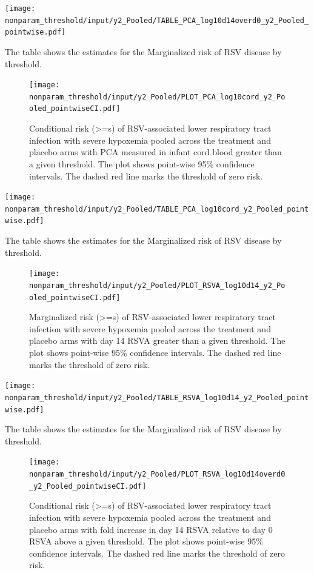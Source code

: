 \documentclass[11pt]{article}
\begin{document}
\begin{table}[H]
\centering
\texttt{[image: nonparam\_threshold/input/y2\_Pooled/TABLE\_PCA\_log10d14overd0\_y2\_Pooled\_pointwise.pdf]}
\caption{The table shows the  estimates for the Marginalized risk of RSV disease by threshold. }
\end{table}

\begin{figure}[H]
\centering
\texttt{[image: nonparam\_threshold/input/y2\_Pooled/PLOT\_PCA\_log10cord\_y2\_Pooled\_pointwiseCI.pdf]}
\caption{Conditional risk (>=s) of RSV-associated lower respiratory tract infection with severe hypoxemia pooled across the treatment and placebo arms with PCA measured in infant cord blood greater than a given threshold. The plot shows point-wise 95\% confidence intervals. The dashed red line marks the threshold of zero risk.}
\end{figure}

\begin{table}[H]
\centering
\texttt{[image: nonparam\_threshold/input/y2\_Pooled/TABLE\_PCA\_log10cord\_y2\_Pooled\_pointwise.pdf]}
\caption{The table shows the  estimates for the Marginalized risk of RSV disease by threshold. }
\end{table}

\begin{figure}[H]
\centering
\texttt{[image: nonparam\_threshold/input/y2\_Pooled/PLOT\_RSVA\_log10d14\_y2\_Pooled\_pointwiseCI.pdf]}
\caption{Marginalized risk (>=s) of RSV-associated lower respiratory tract infection with severe hypoxemia pooled across the treatment and placebo arms with day 14 RSVA greater than a given threshold. The plot shows point-wise 95\% confidence intervals. The dashed red line marks the threshold of zero risk.}
\end{figure}

\begin{table}[H]
\centering
\texttt{[image: nonparam\_threshold/input/y2\_Pooled/TABLE\_RSVA\_log10d14\_y2\_Pooled\_pointwise.pdf]}
\caption{The table shows the  estimates for the Marginalized risk of RSV disease by threshold. }
\end{table}

\begin{figure}[H]
\centering
\texttt{[image: nonparam\_threshold/input/y2\_Pooled/PLOT\_RSVA\_log10d14overd0\_y2\_Pooled\_pointwiseCI.pdf]}
\caption{Conditional risk (>=s) of RSV-associated lower respiratory tract infection with severe hypoxemia pooled across the treatment and placebo arms with fold increase in day 14 RSVA relative to day 0 RSVA above a given threshold. The plot shows point-wise 95\% confidence intervals. The dashed red line marks the threshold of zero risk.}
\end{figure}
\end{document}
